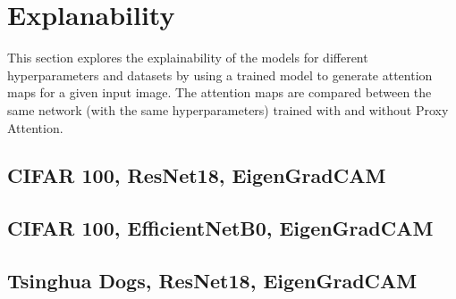 \section{Explanability}
This section explores the explainability of the models for different hyperparameters and datasets by using a trained model to generate attention maps for a given input image. The attention maps are compared between the same network (with the same hyperparameters) trained with and without Proxy Attention.

\subsection{CIFAR 100, ResNet18, EigenGradCAM}


\subsection{CIFAR 100, EfficientNetB0, EigenGradCAM}


\subsection{Tsinghua Dogs, ResNet18, EigenGradCAM}
